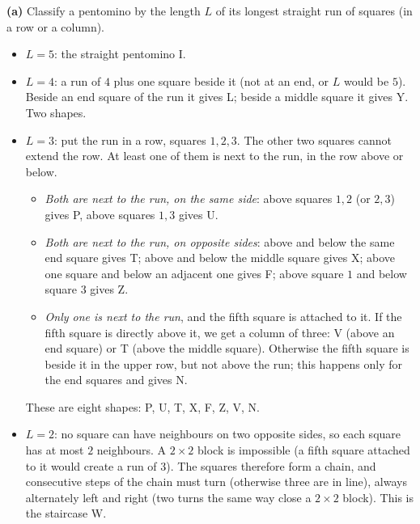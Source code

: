 \textbf{(a)} Classify a pentomino by the length $L$ of its longest straight run of squares (in a row or a column).
\begin{itemize}
\item $L=5$: the straight pentomino I.
\item $L=4$: a run of $4$ plus one square beside it (not at an end, or $L$ would be $5$). Beside an end square of the run it gives L; beside a middle square it gives Y. Two shapes.
\item $L=3$: put the run in a row, squares $1,2,3$. The other two squares cannot extend the row. At least one of them is next to the run, in the row above or below.
\begin{itemize}
\item \emph{Both are next to the run, on the same side}: above squares $1,2$ (or $2,3$) gives P, above squares $1,3$ gives U.
\item \emph{Both are next to the run, on opposite sides}: above and below the same end square gives T; above and below the middle square gives X; above one square and below an adjacent one gives F; above square $1$ and below square $3$ gives Z.
\item \emph{Only one is next to the run}, and the fifth square is attached to it. If the fifth square is directly above it, we get a column of three: V (above an end square) or T (above the middle square). Otherwise the fifth square is beside it in the upper row, but not above the run; this happens only for the end squares and gives N.
\end{itemize}
These are eight shapes: P, U, T, X, F, Z, V, N.
\item $L=2$: no square can have neighbours on two opposite sides, so each square has at most $2$ neighbours. A $2\times2$ block is impossible (a fifth square attached to it would create a run of $3$). The squares therefore form a chain, and consecutive steps of the chain must turn (otherwise three are in line), always alternately left and right (two turns the same way close a $2\times2$ block). This is the staircase W.
\end{itemize}

